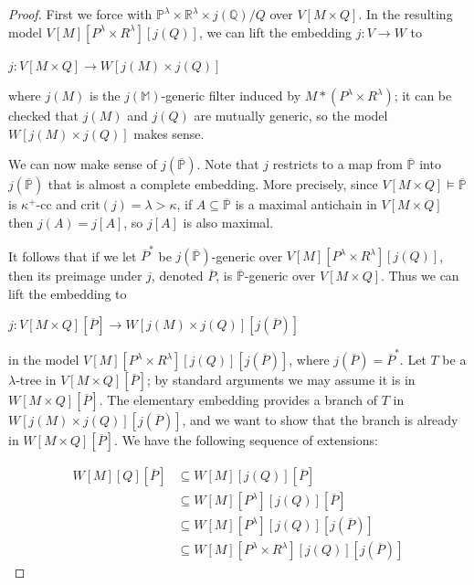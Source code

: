 \documentclass[10pt,a4paper]{amsart}
\begin{document}
\begin{proof}
First we force with $\mathbb{P}^\lambda\times \mathbb{R}^\lambda\times j(\mathbb{Q})/Q$ over $V[M\times Q]$. In the resulting model $V[M][P^\lambda\times R^\lambda][j(Q)]$, we can lift the embedding $j:V\rightarrow W$ to

\begin{center}
$j:V[M\times Q]\rightarrow W[j(M)\times j(Q)]$
\end{center}

\noindent where $j(M)$ is the $j(\mathbb{M})$-generic filter induced by $M*(P^\lambda\times R^\lambda)$; it can be checked that $j(M)$ and $j(Q)$ are mutually generic, so the model $W[j(M)\times j(Q)]$ makes sense.

We can now make sense of $j(\mathbb{\overline{P}})$. Note that $j$ restricts to a map from $\overline{\mathbb{P}}$ into $j(\overline{\mathbb{P}})$ that is almost a complete embedding. More precisely, since $V[M\times Q]\models\mathbb{\overline{P}}$ is $\kappa^+$-cc and $\mathrm{crit}(j)=\lambda>\kappa$, if $A\subseteq\overline{\mathbb{P}}$ is a maximal antichain in $V[M\times Q]$ then $j(A)=j[A]$, so $j[A]$ is also maximal.

It follows that if we let $\overline{P}^*$ be $j(\mathbb{\overline{P}})$-generic over $V[M][P^\lambda\times R^\lambda][j(Q)]$, then its preimage under $j$, denoted $\overline{P}$, is $\overline{\mathbb{P}}$-generic over $V[M\times Q]$. Thus we can lift the embedding to

\begin{center}
$j:V[M\times Q][\overline{P}]\rightarrow W[j(M)\times j(Q)][j(\overline{P})]$
\end{center}

\noindent in the model $V[M][P^\lambda\times R^\lambda][j(Q)][j(\overline{P})]$, where $j(\overline{P})=\overline{P}^*$. Let $T$ be a $\lambda$-tree in $V[M\times Q][\overline{P}]$; by standard arguments we may assume it is in $W[M\times Q][\overline{P}]$. The elementary embedding provides a branch of $T$ in $W[j(M)\times j(Q)][j(\overline{P})]$, and we want to show that the branch is already in $W[M\times Q][\overline{P}]$. We have the following sequence of extensions:

\begin{align}
W[M][Q][\overline{P}]&\subseteq W[M][j(Q)][\overline{P}]\\
&\subseteq W[M][P^\lambda][j(Q)][\overline{P}]\\
&\subseteq W[M][P^\lambda][j(Q)][j(\overline{P})]\\
&\subseteq W[M][P^\lambda\times R^\lambda][j(Q)][j(\overline{P})]
\end{align}


\end{proof}
\end{document}
